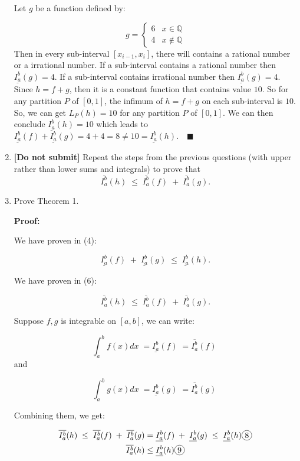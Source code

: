 \documentclass[12pt]{exam}
\newcommand*\circled[1]{\tikz[baseline=(char.base)]{
    \node[shape=circle, draw, inner sep=1pt, 
        minimum height=12pt] (char) {#1};}}
\newcommand{\Q}{\mathbb{Q}}
\begin{document}
\begin{enumerate}
	Let $g$ be a function defined by:
	
	\[
	    g = 
	    \begin{cases}
	        6 & x \in \Q \\
	        4 & x \notin \Q
	    \end{cases}
	\]
	Then in every sub-interval $[x_{i-1},x_i]$, there will contains a rational number or a irrational number. If a sub-interval contains a rational number then $\underline{I_a^b}(g)=4$. If a sub-interval contains irrational number then $\underline{I_a^b}(g)=4$. Since $h=f+g$, then it is a constant function that contains value $10$. So for any partition $P$ of $[0,1]$, the infimum of $h=f+g$ on each sub-interval is $10$. So, we can get $L_P(h)=10$ for any partition $P$ of $[0,1]$. We can then conclude $\underline{I_a^b}(h)=10$ which leads to $\underline{I_a^b}(f)+\underline{I_a^b}(g)=4+4=8\neq10=\underline{I_a^b}(h).\quad\blacksquare$
	
	\newpage


\item {\bf [Do not submit]}  Repeat the steps from the previous questions (with upper rather than lower sums and integrals) to prove that
	$$
		\overline{I_a^b}(h) \; \leq \; \overline{I_a^b}(f) \; + \; \overline{I_a^b}(g).
	$$

\item Prove Theorem 1.

\textbf{Proof:}

We have proven in (4):

$$
	\underline{I_a^b}(f) \; + \; \underline{I_a^b}(g) \; \leq \;  \underline{I_a^b}(h).
$$

We have proven in (6):

$$
    \overline{I_a^b}(h) \; \leq \; \overline{I_a^b}(f) \; + \; \overline{I_a^b}(g).
$$

Suppose $f, g$ is integrable on $[a,b]$, we can write:

$$
     \int_a^b f(x) dx \; = \underline{I_a^b}(f) \; = \overline{I_a^b}(f) \;
$$
and

$$
    \int_a^b g(x) dx \; = \underline{I_a^b}(g) \; = \overline{I_a^b}(g) \;
$$

Combining them, we get:

\begin{align*}
    \overline{I_a^b}(h) \; \leq \; \overline{I_a^b}(f) \; + \; \overline{I_a^b}(g) &= \underline{I_a^b}(f) \; + \; \underline{I_a^b}(g) \; \leq \;  \underline{I_a^b}(h) \circled{8} \\ 
    \overline{I_a^b}(h) &\leq \underline{I_a^b}(h) \circled{9}
\end{align*}


\end{enumerate}
\end{document}
